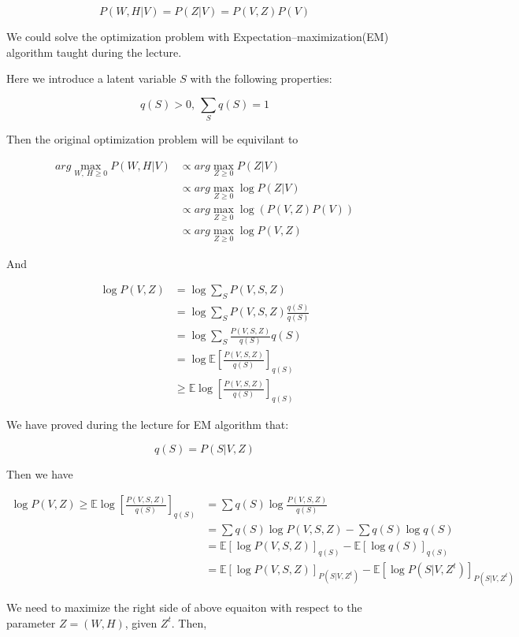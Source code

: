 \documentclass[11pt]{article}
\begin{document}
\[ P(W, H|V) = P(Z|V) = P(V,Z)P(V) \]

We could solve the optimization problem with
Expectation--maximization(EM) algorithm taught during the lecture.

Here we introduce a latent variable \(S\) with the following properties:

\[q(S) > 0,\  \sum_S q(S) = 1 \]

Then the original optimization problem will be equivilant to

\begin{align}
arg \max_{W,\  H \geq 0} P(W, H|V)  
& \propto  arg \max_{Z \geq 0} P(Z|V) \\
& \propto  arg \max_{Z \geq 0} \log P(Z|V) \\
& \propto  arg \max_{Z \geq 0} \log (P(V, Z)P(V)) \\ 
& \propto  arg \max_{Z \geq 0} \log P(V, Z)
\end{align}

    And

\begin{align}
\log P(V, Z)
&=  \log \sum_S P(V, S, Z) \\
& = \log \sum_S P(V, S, Z) \frac{q(S)}{q(S)} \\
& = \log \sum_S \frac{P(V, S, Z)}{q(S)} q(S) \\
& = \log \mathbb{E}[\frac{P(V, S, Z)}{q(S)}]_{q(S)} \\
& \geq \mathbb{E} \log [\frac{P(V, S, Z)}{q(S)}]_{q(S)}
\end{align}

We have proved during the lecture for EM algorithm that:

\[ q(S) = P(S|V, Z)\]

    Then we have

\begin{align}
\log P(V, Z) \geq \mathbb{E} \log [\frac{P(V, S, Z)}{q(S)}]_{q(S)} 
&  = \sum q(S) \log \frac{P(V, S, Z)}{q(S)} \\
&  = \sum q(S) \log {P(V, S, Z)} - \sum q(S) \log q(S) \\
&  = \mathbb{E} [\log P(V, S, Z)]_{q(S)} - \mathbb{E} [\log q(S)]_{q(S)} \\
&  = \mathbb{E} [\log P(V, S, Z)]_{P(S|V, Z^{t})} - \mathbb{E} [\log P(S|V, Z^{t})]_{P(S|V, Z^{t})}
\end{align}

We need to maximize the right side of above equaiton with respect to the
parameter \(Z = (W, H)\), given \(Z^t\). Then,
\end{document}
